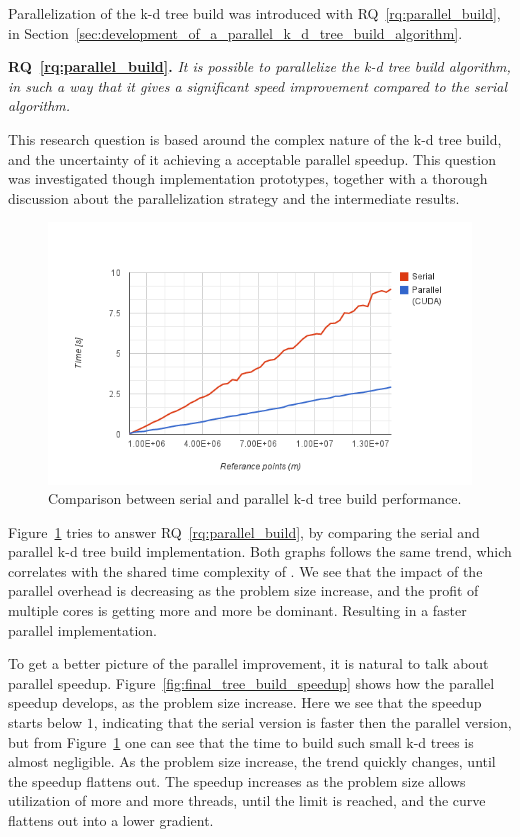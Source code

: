 Parallelization of the k-d tree build was introduced with RQ~\ref{rq:parallel_build}, in Section~\ref{sec:development_of_a_parallel_k_d_tree_build_algorithm}.

\textbf{RQ~\ref{rq:parallel_build}.} \emph{It is possible to parallelize the k-d tree build algorithm, in such a way that it gives a significant speed improvement compared to the serial algorithm.}

This research question is based around the complex nature of the k-d tree build, and the uncertainty of it achieving a acceptable parallel speedup. This question was investigated though implementation prototypes, together with a thorough discussion about the parallelization strategy and the intermediate results. 

\begin{figure}[ht!]
    \centering
    \includegraphics[width=120mm]{../gfx/final_tree_build.png}
    \caption{Comparison between serial and parallel k-d tree build performance.}
    \label{fig:final_tree_build}
\end{figure}

Figure~\ref{fig:final_tree_build} tries to answer RQ~\ref{rq:parallel_build}, by comparing the serial and parallel k-d tree build implementation. Both graphs follows the same trend, which correlates with the shared time complexity of . We see that the impact of the parallel overhead is decreasing as the problem size increase, and the profit of multiple cores is getting more and more be dominant. Resulting in a faster parallel implementation.

To get a better picture of the parallel improvement, it is natural to talk about parallel speedup. Figure~\ref{fig:final_tree_build_speedup} shows how the parallel speedup develops, as the problem size increase. Here we see that the speedup starts below $1$, indicating that the serial version is faster then the parallel version, but from Figure~\ref{fig:final_tree_build} one can see that the time to build such small k-d trees is almost negligible. As the problem size increase, the trend quickly changes, until the speedup flattens out. The speedup increases as the problem size allows utilization of more and more threads, until the limit is reached, and the curve flattens out into a lower gradient.      

